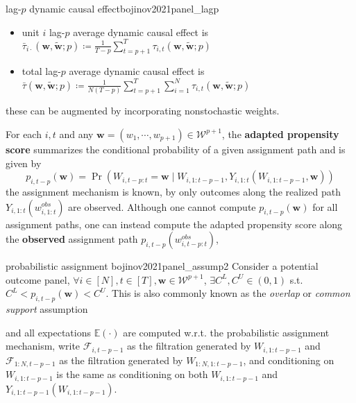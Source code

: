 \documentclass[twoside]{article}
\begin{document}
\begin{definition}{lag-$p$ dynamic causal effect}{bojinov2021panel_lagp}
\begin{itemize}
\begin{itemize}
            \item unit $i$ lag-$p$ average dynamic causal effect is $\bar{\tau}_{i\cdot} \left(\mathbf{w},\tilde{\mathbf{w}};p\right) \coloneq \frac{1}{T-p} \sum^T_{t=p+1}\tau_{i,t}\left(\mathbf{w},\tilde{\mathbf{w}};p\right)$
            \item total lag-$p$ average dynamic causal effect is $ \bar{\tau}\left(\mathbf{w},\tilde{\mathbf{w}};p\right) \coloneq \frac{1}{N(T-p)} \sum^T_{t=p+1}\sum^N_{i=1}\tau_{i,t}\left(\mathbf{w},\tilde{\mathbf{w}};p\right) $ 
        \end{itemize}
        these can be augmented by incorporating nonstochastic weights.
    \end{itemize} 
\end{definition}

For each $i,t$ and any $\mathbf{w} = \left(w_1,\cdots,w_{p+1}\right)\in\mathcal{W}^{p+1}$, the \textbf{adapted propensity score} summarizes the conditional probability of a given assignment path and is given by $$ p_{i,t-p}\left(\mathbf{w}\right) = \Pr \left(W_{i,t-p:t}=\mathbf{w} \mid W_{i,1:t-p-1},Y_{i,1:t}\left(W_{i,1:t-p-1},\mathbf{w}\right)\right) $$
the assignment mechanism is known, by only outcomes along the realized path $Y_{i,1:t}(w^{obs}_{i,1:t})$ are observed. Although one cannot compute $p_{i,t-p}(\mathbf{w})$ for all assignment paths, one can instead compute the adapted propensity score along the \textbf{observed} assignment path $p_{i,t-p}\left(w^{obs}_{i,t-p:t}\right)$,
\begin{assumption}{probabilistic assignment \citep{bojinov2021panel}}{bojinov2021panel_assump2}
    Consider a potential outcome panel, $\forall i\in[N],t\in[T],\mathbf{w}\in\mathcal{W}^{p+1}$, $\exists C^L,C^U\in \left(0,1\right)$ s.t. $C^L<p_{i,t-p}(\mathbf{w})<C^U$. This is also commonly known as the \textit{overlap} or \textit{common support} assumption
\end{assumption}
and all expectations $\mathbb{E}\left(\cdot\right)$ are computed w.r.t. the probabilistic assignment mechanism, write $\mathcal{F}_{i,t-p-1}$ as the filtration generated by $W_{i,1:t-p-1}$ and $\mathcal{F}_{1:N,t-p-1}$ as the filtration generated by $W_{1:N,1:t-p-1}$, and conditioning on $W_{i,1:t-p-1}$ is the same as conditioning on both $W_{i,1:t-p-1}$ and $Y_{i,1:t-p-1}\left(W_{i,1:t-p-1}\right)$.
\end{document}
